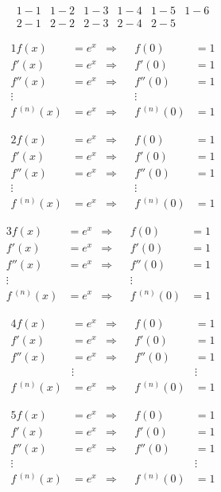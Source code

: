\documentclass[oneside]{book}
\begin{document}
\begin{align*}1-1&1-2&1-3&1-4&1-5&1-6\\2-1&2-2&2-3&2-4&2-5&\end{align*}

\begin{align*}
1f(x)&=e^x & \Rightarrow && f(0)&=1 \\
f'(x)&=e^x & \Rightarrow && f'(0)&=1 \\
f''(x)&=e^x & \Rightarrow && f''(0)&=1 \\
\vdots &&&& \vdots & \\
f\,^{(n)}(x)&=e^x & \Rightarrow && f\,^{(n)}(0)&=1
\end{align*}

\begin{align*}
2f(x)&=e^x & \Rightarrow && f(0)&=1 \\
f'(x)&=e^x & \Rightarrow && f'(0)&=1 \\
f''(x)&=e^x & \Rightarrow && f''(0)&=1 \\
\vdots &\,&\,&& \vdots & \\
f\,^{(n)}(x)&=e^x & \Rightarrow && f\,^{(n)}(0)&=1
\end{align*}

\begin{align*}
3f(x)&=e^x & \Rightarrow && f(0)&=1 \\
f'(x)&=e^x & \Rightarrow && f'(0)&=1 \\
f''(x)&=e^x & \Rightarrow && f''(0)&=1 \\
\vdots &&&& \vdots && \\
f\,^{(n)}(x)&=e^x & \Rightarrow && f\,^{(n)}(0)&=1
\end{align*}

\begin{align*}
4f(x)&=e^x & \Rightarrow && f(0)&=1 \\
f'(x)&=e^x & \Rightarrow && f'(0)&=1 \\
f''(x)&=e^x & \Rightarrow && f''(0)&=1 \\
& \vdots &&&& \vdots \\
f\,^{(n)}(x)&=e^x & \Rightarrow && f\,^{(n)}(0)&=1
\end{align*}

\begin{align*}
5f(x)&=e^x & \Rightarrow && f(0)&=1 \\
f'(x)&=e^x & \Rightarrow && f'(0)&=1 \\
f''(x)&=e^x & \Rightarrow && f''(0)&=1 \\
\vdots &&&&& \vdots \\
f\,^{(n)}(x)&=e^x & \Rightarrow && f\,^{(n)}(0)&=1
\end{align*}
\end{document}
